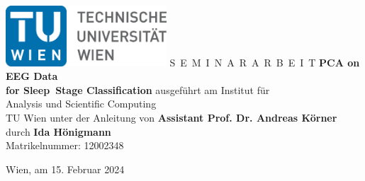 \documentclass[a4paper,11pt,bibliography=totoc,listof=totoc,headinclude=true,cleardoublepage=empty,oneside]{scrbook}
\begin{document}


\begin{titlepage}
  \begin{center}
    \includegraphics[width=0.45\textwidth]{TULogo.eps}
    \vskip 1cm%
    {\LARGE S~\Large E~M~I~N~A~R~A~R~B~E~I~T}
    \vskip 8mm
    {\huge\bfseries PCA on EEG Data \\[1ex] for Sleep~Stage Classification}
    \vskip 1cm
    \large 
    ausgef\"uhrt am    
    \vskip 0.75cm
    {\Large Institut f\"ur\\[1ex] Analysis und Scientific Computing}\\[1ex]
    {\Large TU Wien}
    \vskip0.75cm
    unter der Anleitung von
    \vskip0.75cm
    {\Large\bfseries Assistant Prof. Dr. Andreas Körner}\\[1ex]
    \vskip 0.5cm
    durch
    \vskip 0.5cm
    {\Large\bfseries Ida Hönigmann}\\[1ex]
    Matrikelnummer: {12002348}
  \end{center}
  
  \vfill
  
  \small
  Wien, am {15. Februar 2024}
  \vspace*{-15mm}
\end{titlepage}

\cleardoublepage



\tableofcontents

\cleardoublepage
{} 










\listoffigures
\listoftables
\listofalgorithms


%

\end{document}
